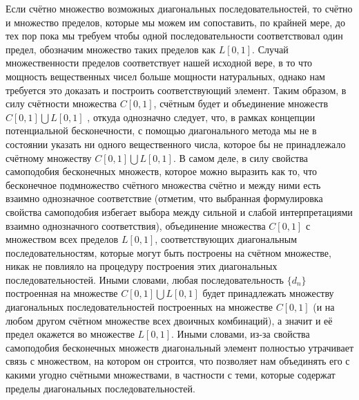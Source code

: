 \documentclass[12pt]{article}
\begin{document}
Если счётно множество возможных диагональных последовательностей, то счётно и множество пределов, которые мы можем им сопоставить, по крайней мере, до тех пор пока мы требуем чтобы одной последовательности соответствовал один предел, обозначим множество таких пределов как $L[0, 1]$. Случай множественности пределов соответствует нашей исходной вере, в то что мощность вещественных чисел больше мощности натуральных, однако нам требуется это доказать и построить соответствующий элемент. Таким образом, в силу счётности множества $C[0, 1]$, счётным будет и объединение множеств $C[0, 1] \bigcup L[0, 1]$ \cite{matan-countable-union}, откуда однозначно следует, что, в рамках концепции потенциальной бесконечности, с помощью диагонального метода мы не в состоянии указать ни одного вещественного числа, которое бы не принадлежало счётному множеству $C[0, 1] \bigcup L[0, 1]$. В самом деле, в силу свойства самоподобия бесконечных множеств, которое можно выразить как то, что бесконечное подмножество счётного множества счётно и между ними есть взаимно однозначное соответствие \cite{matan-countable-subset} (отметим, что выбранная формулировка свойства самоподобия избегает выбора между сильной и слабой интерпретациями взаимно однозначного соответствия), объединение множества $C[0, 1]$ с множеством всех пределов $L[0, 1]$, соответствующих диагональным последовательностям, которые могут быть построены на счётном множестве, никак не повлияло на процедуру построения этих диагональных последовательностей. Иными словами, любая последовательность $\{d_n\}$ построенная на множестве $C[0, 1] \bigcup L[0, 1]$ будет принадлежать множеству диагональных последовательностей построенных на множестве $C[0, 1]$ (и на любом другом счётном множестве всех двоичных комбинаций), а значит и её предел окажется во множестве $L[0, 1]$. Иными словами, из-за свойства самоподобия бесконечных множеств диагональный элемент полностью утрачивает связь с множеством, на котором он строится, что позволяет нам объединять его с какими угодно счётными множествами, в частности с теми, которые содержат пределы диагональных последовательностей.
\end{document}
